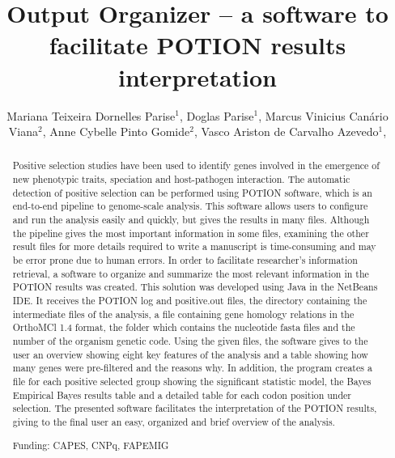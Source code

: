 \documentclass[twoside]{article}
\title{\vspace{-15mm}\fontsize{24pt}{10pt}\selectfont\textbf{ Output Organizer – a software to facilitate POTION results interpretation }} %
\author{ Mariana Teixeira Dornelles Parise$^{1}$, Doglas Parise$^{1}$, Marcus Vinicius Canário Viana$^{2}$, Anne Cybelle Pinto Gomide$^{2}$, Vasco Ariston de Carvalho Azevedo$^{1}$, }
\affil{ 1 Universidade Federal de Minas Gerais

2 Federal University of Minas Gerais

 }
\date{}
\begin{document}
  
  
  \maketitle %
  
  
  \thispagestyle{fancy} %
  
  
  \begin{abstract}
  Positive selection studies have been used to identify genes involved in the emergence of new phenotypic traits, speciation and host-pathogen interaction. The automatic detection of positive selection can be performed using POTION software, which is an end-to-end pipeline to genome-scale analysis. This software allows users to configure and run the analysis easily and quickly, but gives the results in many files. Although the pipeline gives the most important information in some files, examining the other result files for more details required to write a manuscript is time-consuming and may be error prone due to human errors. In order to facilitate researcher’s information retrieval, a software to organize and summarize the most relevant information in the POTION results was created.  This solution was developed using Java in the NetBeans IDE. It receives the POTION log and positive.out files, the directory containing the intermediate files of the analysis, a file containing gene homology relations in the OrthoMCl 1.4 format, the folder which contains the nucleotide fasta files and the number of the organism genetic code. Using the given files, the software gives to the user an overview showing eight key features of the analysis and a table showing how many genes were pre-filtered and the reasons why. In addition, the program creates a file for each positive selected group showing the significant statistic model, the Bayes Empirical Bayes results table and a detailed table for each codon position under selection. The presented software facilitates the interpretation of the POTION results, giving to the final user an easy, organized and brief overview of the analysis.
  
  Funding: CAPES, CNPq, FAPEMIG \\ 
  \end{abstract}
  
\end{document}
